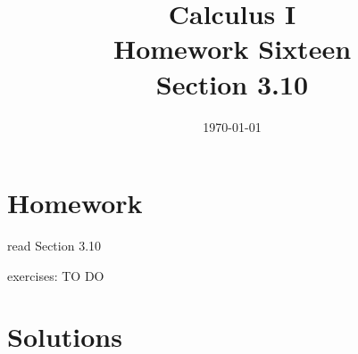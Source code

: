 \documentclass[letterpaper, landscape]{exam}
\title{Calculus I \\ Homework Sixteen \\ Section 3.10}
\author{}
\date{\today}
\begin{document}
  \maketitle

  \section{Homework}
    \begin{itemize*}
      \item read Section 3.10
      \item exercises: TO DO
    \end{itemize*}

  \ifprintanswers

  \section{Solutions}
\end{document}
